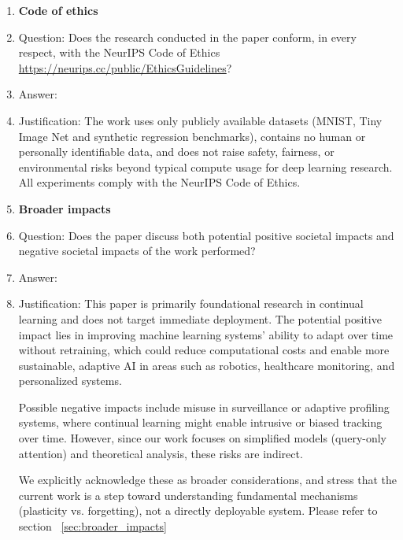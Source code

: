\documentclass{article}
\begin{document}
\begin{enumerate}
    
\item {\bf Code of ethics}
    \item[] Question: Does the research conducted in the paper conform, in every respect, with the NeurIPS Code of Ethics \url{https://neurips.cc/public/EthicsGuidelines}?
    \item[] Answer:  \answerYes{} %
    \item[] Justification: The work uses only publicly available datasets (MNIST, Tiny Image Net and synthetic regression benchmarks), contains no human or personally identifiable data, and does not raise safety, fairness, or environmental risks beyond typical compute usage for deep learning research. All experiments comply with the NeurIPS Code of Ethics.
   

\item {\bf Broader impacts}
    \item[] Question: Does the paper discuss both potential positive societal impacts and negative societal impacts of the work performed?
    \item[] Answer: \answerYes{} %
    \item[] Justification: This paper is primarily foundational research in continual learning and does not target immediate deployment. The potential positive impact lies in improving machine learning systems’ ability to adapt over time without retraining, which could reduce computational costs and enable more sustainable, adaptive AI in areas such as robotics, healthcare monitoring, and personalized systems.

    Possible negative impacts include misuse in surveillance or adaptive profiling systems, where continual learning might enable intrusive or biased tracking over time. However, since our work focuses on simplified models (query-only attention) and theoretical analysis, these risks are indirect.

    We explicitly acknowledge these as broader considerations, and stress that the current work is a step toward understanding fundamental mechanisms (plasticity vs. forgetting), not a directly deployable system. Please refer to section ~\ref{sec:broader_impacts}


\end{enumerate}
\end{document}
